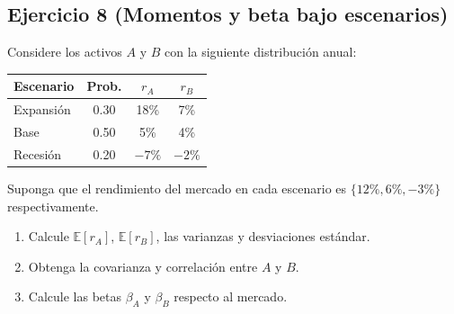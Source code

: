\documentclass[12pt,a4paper]{article}
\newcommand{\E}{\mathbb{E}}
\newenvironment{ejercicio}[1]{\subsection*{Ejercicio #1}}{}
\begin{document}
\begin{ejercicio}{8 (Momentos y beta bajo escenarios)}
Considere los activos $A$ y $B$ con la siguiente distribución anual:
\begin{center}
\begin{tabular}{lccc}
\toprule
Escenario & Prob. & $r_A$ & $r_B$ \\
\midrule
Expansión & 0.30 & 18\% & 7\% \\
Base & 0.50 & 5\% & 4\% \\
Recesión & 0.20 & $-7\%$ & $-2\%$ \\
\bottomrule
\end{tabular}
\end{center}
Suponga que el rendimiento del mercado en cada escenario es $\{12\%, 6\%, -3\%\}$ respectivamente.
\begin{enumerate}[label=\alph*)]
  \item Calcule $\E[r_A]$, $\E[r_B]$, las varianzas y desviaciones estándar.
  \item Obtenga la covarianza y correlación entre $A$ y $B$.
  \item Calcule las betas $\beta_A$ y $\beta_B$ respecto al mercado.
\end{enumerate}
\end{ejercicio}
\end{document}

